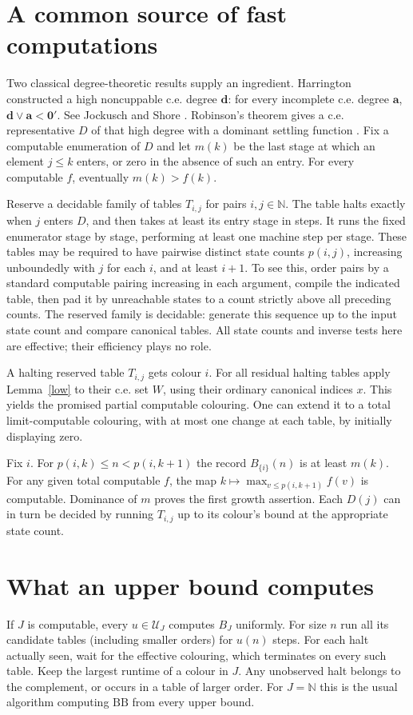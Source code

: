 \documentclass[11pt]{article}
\newcommand{\BB}{\mathrm{BB}}
\newcommand{\om}{\mathbb N}
\begin{document}
\section{A common source of fast computations}
Two classical degree-theoretic results supply an ingredient. Harrington constructed a high noncuppable c.e. degree $\mathbf d$: for every incomplete c.e. degree $\mathbf a$, $\mathbf d\vee\mathbf a<\mathbf 0'$. See Jockusch and Shore \cite{js}. Robinson's theorem gives a c.e. representative $D$ of that high degree with a dominant settling function \cite{robinson,csima}. Fix a computable enumeration of $D$ and let $m(k)$ be the last stage at which an element $j\le k$ enters, or zero in the absence of such an entry. For every computable $f$, eventually $m(k)>f(k)$.

Reserve a decidable family of tables $T_{i,j}$ for pairs $i,j\in\om$. The table halts exactly when $j$ enters $D$, and then takes at least its entry stage in steps. It runs the fixed enumerator stage by stage, performing at least one machine step per stage. These tables may be required to have pairwise distinct state counts $p(i,j)$, increasing unboundedly with $j$ for each $i$, and at least $i+1$. To see this, order pairs by a standard computable pairing increasing in each argument, compile the indicated table, then pad it by unreachable states to a count strictly above all preceding counts. The reserved family is decidable: generate this sequence up to the input state count and compare canonical tables. All state counts and inverse tests here are effective; their efficiency plays no role.

A halting reserved table $T_{i,j}$ gets colour $i$. For all residual halting tables apply Lemma~\ref{low} to their c.e. set $W$, using their ordinary canonical indices $x$. This yields the promised partial computable colouring. One can extend it to a total limit-computable colouring, with at most one change at each table, by initially displaying zero.

Fix $i$. For $p(i,k)\le n<p(i,k+1)$ the record $B_{\{i\}}(n)$ is at least $m(k)$. For any given total computable $f$, the map $k\mapsto\max_{v\le p(i,k+1)}f(v)$ is computable. Dominance of $m$ proves the first growth assertion. Each $D(j)$ can in turn be decided by running $T_{i,j}$ up to its colour's bound at the appropriate state count.

\section{What an upper bound computes}
If $J$ is computable, every $u\in\mathcal U_J$ computes $B_J$ uniformly. For size $n$ run all its candidate tables (including smaller orders) for $u(n)$ steps. For each halt actually seen, wait for the effective colouring, which terminates on every such table. Keep the largest runtime of a colour in $J$. Any unobserved halt belongs to the complement, or occurs in a table of larger order. For $J=\om$ this is the usual algorithm computing $\BB$ from every upper bound.
\end{document}
